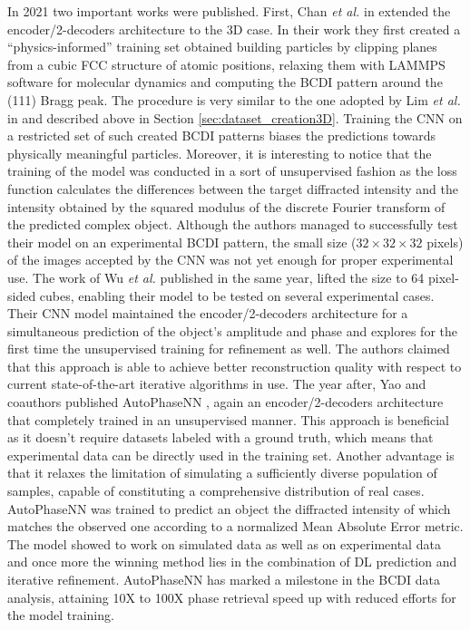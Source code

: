 In 2021 two important works were published. First, Chan \textit{et al.} in 
\cite{chan_rapid_2021} extended the encoder/2-decoders architecture to the 3D case. In their work they first created a 
``physics-informed'' training set obtained building particles by clipping planes from a cubic FCC structure of atomic 
positions, relaxing them with LAMMPS software for molecular dynamics and computing the BCDI pattern around the (111) Bragg 
peak. The procedure is very similar to the one adopted by Lim \textit{et al.} in \cite{lim_convolutional_2021} and described
above in Section \ref{sec:dataset_creation3D}. Training the CNN on a restricted set of such created BCDI patterns biases 
the predictions towards physically meaningful particles. Moreover, it is interesting to notice that the training of the model 
was conducted in a sort of unsupervised fashion as the loss function calculates the differences between the target diffracted
intensity and the intensity obtained by the squared modulus of the discrete Fourier transform of the predicted complex object.
Although the authors managed to successfully test their model on
an experimental BCDI pattern, the small size ($32\times32\times32$ pixels) of the images accepted by the CNN was not yet 
enough for proper experimental use. The work of Wu \textit{et al.} \cite{wu_three-dimensional_2021} published 
in the same year, lifted the size to 64 pixel-sided cubes, enabling their model to be tested on several experimental cases. 
Their CNN model maintained the encoder/2-decoders architecture for a simultaneous prediction of the object's amplitude and phase 
and explores for the first time the unsupervised training for refinement as well. The authors claimed that this approach is 
able to achieve better reconstruction quality with respect to current state-of-the-art iterative algorithms in use. 
The year after, Yao and coauthors published AutoPhaseNN \cite{yao_autophasenn_2022}, again an encoder/2-decoders architecture
that completely trained in an unsupervised manner. This approach is beneficial as it doesn't require datasets labeled with 
a ground truth, which means that experimental data can be directly used in the training set. Another advantage is that it 
relaxes the limitation of simulating a sufficiently diverse population of samples, capable of constituting a comprehensive 
distribution of real cases. AutoPhaseNN was trained to predict an object the diffracted intensity of which matches the observed
one according to a normalized Mean Absolute Error metric. The model showed to work on simulated data as well as on experimental 
data and once more the winning method lies in the combination of DL prediction and iterative refinement. 
AutoPhaseNN has marked a milestone in the BCDI data analysis, attaining 10X to 100X phase retrieval speed up with reduced efforts 
for the model training. 

